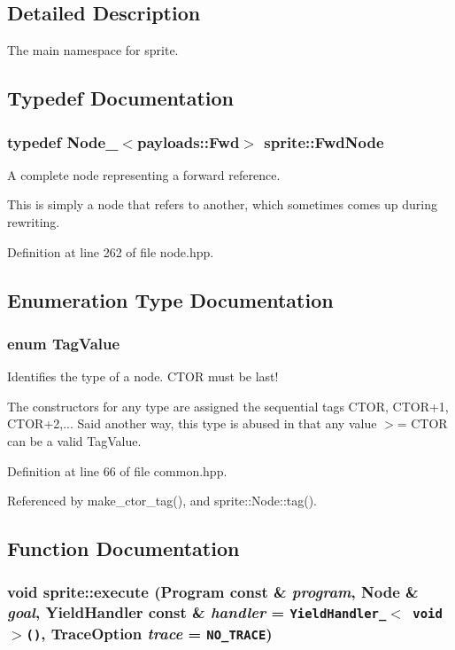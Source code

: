 \subsection{Detailed Description}
The main namespace for sprite. 

\subsection{Typedef Documentation}
\subsubsection{\setlength{\rightskip}{0pt plus 5cm}typedef {\bf Node\_\-}$<${\bf payloads::Fwd}$>$ {\bf sprite::Fwd\-Node}}\label{namespacesprite_a32}


A complete node representing a forward reference. 

This is simply a node that refers to another, which sometimes comes up during rewriting. 

Definition at line 262 of file node.hpp.

\subsection{Enumeration Type Documentation}
\subsubsection{\setlength{\rightskip}{0pt plus 5cm}enum {\bf Tag\-Value}}\label{namespacesprite_a72}


Identifies the type of a node. CTOR must be last! 

The constructors for any type are assigned the sequential tags CTOR, CTOR+1, CTOR+2,... Said another way, this type is abused in that any value $>$= CTOR can be a valid Tag\-Value. 

Definition at line 66 of file common.hpp.

Referenced by make\_\-ctor\_\-tag(), and sprite::Node::tag().

\subsection{Function Documentation}
\subsubsection{\setlength{\rightskip}{0pt plus 5cm}void sprite::execute (Program const \& {\em program}, Node \& {\em goal}, Yield\-Handler const \& {\em handler} = {\tt YieldHandler\_\-$<$\ void\ $>$()}, {\bf Trace\-Option} {\em trace} = {\tt NO\_\-TRACE})}\label{namespacesprite_a49}


